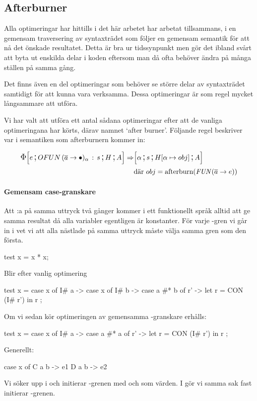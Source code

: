 \documentclass[../Optimise]{subfiles}
\begin{document}
\subsection{Afterburner}

Alla optimeringar har hittills i det här arbetet har arbetat tillsammans, i en gemensam
traversering av syntaxträdet som följer en gemensam semantik för att nå det önskade resultatet. 
Detta är bra ur tidssynpunkt men gör det ibland svårt att byta ut enskilda delar i koden
eftersom man då ofta behöver ändra på många ställen på samma gång.

Det finns även en del optimeringar som behöver se större delar av syntaxträdet
samtidigt för att kunna vara verksamma. Dessa optimeringar är som regel mycket långsammare att utföra.

Vi har valt att utföra ett antal sådana optimeringar efter att de vanliga
optimeringana har körts, därav namnet `after burner'. Följande regel beskriver
var i semantiken som afterburnern kommer in:

\begin{align*}
\CBNIRR{\cOFUN{\many{a}}{\alpha}s}HAe \Rightarrow & \CBNMC{\alpha}{s}{\heap{\alpha}{obj}}A \\
 & \text{där } obj = \text{afterburn} (\FUN{\many{a}}e)
\end{align*}

\paragraph{Gemensam case-granskare} 
Att :a på samma uttryck två gånger kommer i ett funktionellt språk alltid att ge
samma resultat då alla variabler egentligen är konstanter. För varje -gren
vi går in i vet vi att alla nästlade  på samma uttryck måste välja samma
gren som den första.

\begin{codeEx}
test x = x * x;
\end{codeEx}

Blir efter vanlig optimering

\begin{codeEx}
test x = case x of
            { I# a -> case x of
                { I# b -> case a #* b of
                    { r' -> let r = CON (I# r')
                            in r
            }   }   };
\end{codeEx}

Om vi sedan kör optimeringen av gemensamma -granskare erhålls:
\begin{codeEx}
test x = case x of
            { I# a -> case a #* a of
                { r' -> let r = CON (I# r')
                        in r
            }   };
\end{codeEx}

Generellt:
\begin{codeEx}
case x of
    C a b -> e1
    D a b -> e2
\end{codeEx}

Vi söker upp  i  och initierar 
-grenen med  och  som värden. I  gör vi samma sak fast initierar -grenen.
\end{document}
